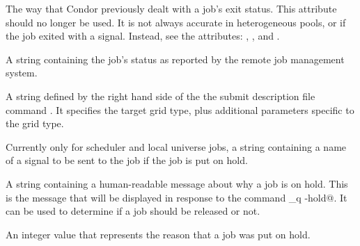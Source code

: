 \begin{description}

\item[\AdAttr{ExitStatus}:]  The way that Condor previously dealt with
a job's exit status.
This attribute should no longer be used.
It is not always accurate in
heterogeneous pools, or if the job exited with a signal.
Instead, see the attributes: ,
, and
.

\item[\AdAttr{GridJobStatus}:] A string containing the job's status as
reported by the remote job management system.

\item[\AdAttr{GridResource}:] A string defined by the right hand side
of the the submit description file command .
It specifies the target grid type, plus additional parameters
specific to the grid type.

\item[\AdAttr{HoldKillSig}:]    Currently only for scheduler and local
universe jobs,
a string containing a name of
a signal to be sent to the job if the job is put on hold.

\item[\AdAttr{HoldReason}:]    A string containing a human-readable
message about why a job is on hold.
This is the message that will be displayed in response to
the command \verb@condor_q -hold@.
It can be used to determine if a job should be released or not.

\item[\AdAttr{HoldReasonCode}:]    An integer value that represents the
reason that a job was put on hold.


\end{description}
